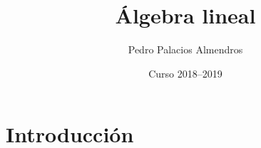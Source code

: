 \documentclass[a4paper, 10pt, openany]{report}
\title{Álgebra lineal}
\author{Pedro Palacios Almendros}
\date{Curso 2018--2019}
\begin{document}
\maketitle

\tableofcontents

\chapter{Introducción}

\end{document}
